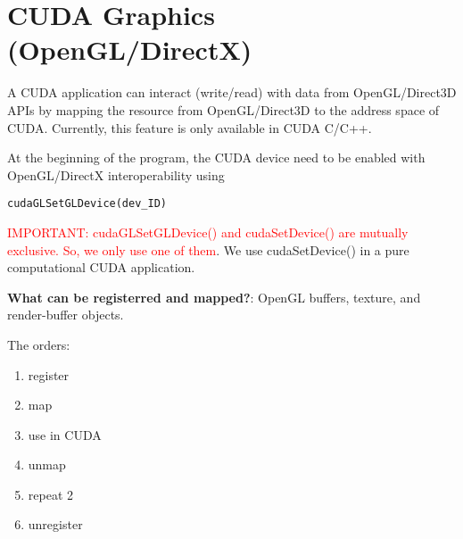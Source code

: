 \chapter{CUDA Graphics (OpenGL/DirectX)}
\label{chap:CUDA_OpenGL.DirectX}

A CUDA application can interact (write/read) with data from OpenGL/Direct3D
APIs by mapping the resource from OpenGL/Direct3D to the address space of CUDA.
Currently, this feature is only available in CUDA C/C++. 

At the beginning of the program, the CUDA device need to be enabled with
OpenGL/DirectX interoperability using
\begin{verbatim}
cudaGLSetGLDevice(dev_ID)
\end{verbatim}
\textcolor{red}{IMPORTANT: cudaGLSetGLDevice() and cudaSetDevice() are mutually
exclusive. So, we only use one of them}. We use cudaSetDevice()   in a
pure computational CUDA application.

{\bf What can be registerred and mapped?}: OpenGL buffers, texture, and
render-buffer objects.

The orders:
\begin{enumerate}
  \item register
  \item map
  \item use in CUDA
  \item unmap
  \item repeat 2
  \item unregister
\end{enumerate}

